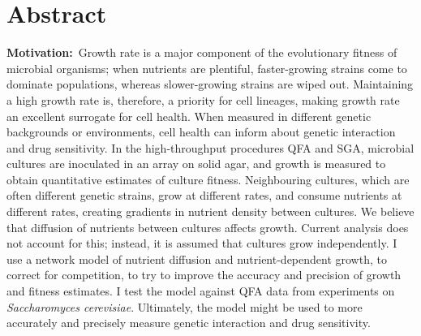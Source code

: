 \section*{Abstract}
\label{sec:abstract}


\textbf{Motivation:}~Growth rate is a major component of the
evolutionary fitness of microbial organisms; when nutrients are
plentiful, faster-growing strains come to dominate populations,
whereas slower-growing strains are wiped out. Maintaining a high
growth rate is, therefore, a priority for cell lineages, making growth
rate an excellent surrogate for cell health. When measured in
different genetic backgrounds or environments, cell health can inform
about genetic interaction and drug sensitivity. In the high-throughput
procedures QFA and SGA, microbial cultures are inoculated in an array
on solid agar, and growth is measured to obtain quantitative estimates
of culture fitness. Neighbouring cultures, which are often different
genetic strains, grow at different rates, and consume nutrients at
different rates, creating gradients in nutrient density between
cultures. We believe that diffusion of nutrients between cultures
affects growth. Current analysis does not account for this; instead,
it is assumed that cultures grow independently. I use a network model
of nutrient diffusion and nutrient-dependent growth, to correct for
competition, to try to improve the accuracy and precision of growth
and fitness estimates. I test the model against QFA data from
experiments on \textit{Saccharomyces cerevisiae}. Ultimately, the
model might be used to more accurately and precisely measure genetic
interaction and drug sensitivity.
\\
